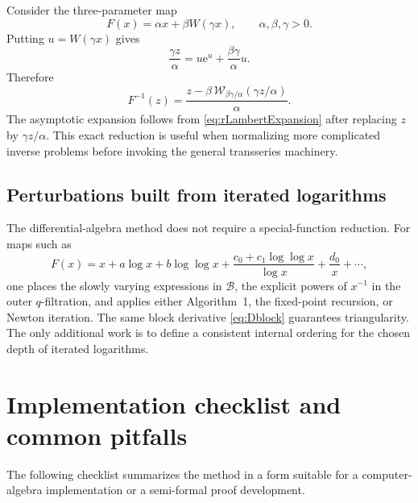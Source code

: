 \documentclass[11pt]{article}
\theoremstyle{clean}
\newcommand{\rLambert}{\mathcal W}
\newcommand{\e}{\mathrm e}
\begin{document}
Consider the three-parameter map
\begin{equation}\label{eq:scaledF}
  F(x)=\alpha x+\beta W(\gamma x),
  \qquad \alpha,\beta,\gamma>0.
\end{equation}
Putting \(u=W(\gamma x)\) gives
\[
  \frac{\gamma z}{\alpha}
  =u\e^u+\frac{\beta\gamma}{\alpha}u.
\]
Therefore
\begin{equation}\label{eq:scaledinverse}
  \boxed{\quad
  F^{-1}(z)=\frac{z-\beta\,
  \rLambert_{\beta\gamma/\alpha}(\gamma z/\alpha)}{\alpha}.
  \quad}
\end{equation}
The asymptotic expansion follows from \cref{eq:rLambertExpansion} after
replacing \(z\) by \(\gamma z/\alpha\).  This exact reduction is useful when
normalizing more complicated inverse problems before invoking the general
transseries machinery.

\subsection{Perturbations built from iterated logarithms}

The differential-algebra method does not require a special-function reduction.
For maps such as
\[
  F(x)=x+a\log x+b\log\log x
  +\frac{c_0+c_1\log\log x}{\log x}
  +\frac{d_0}{x}+\cdots,
\]
one places the slowly varying expressions in \(\mathcal B\), the explicit
powers of \(x^{-1}\) in the outer \(q\)-filtration, and applies either
Algorithm~1, the fixed-point recursion, or Newton iteration.  The same block
derivative \cref{eq:Dblock} guarantees triangularity.  The only additional
work is to define a consistent internal ordering for the chosen depth of
iterated logarithms.

\section{Implementation checklist and common pitfalls}

The following checklist summarizes the method in a form suitable for a
computer-algebra implementation or a semi-formal proof development.
\end{document}
